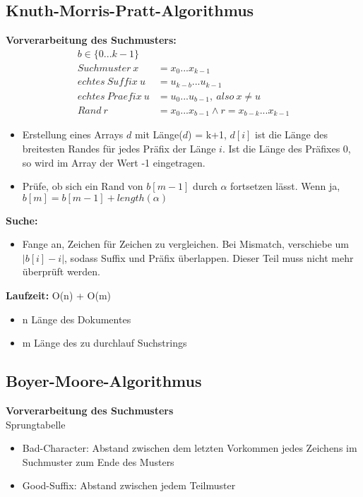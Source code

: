 \documentclass{article}
\begin{document}
\subsection{Knuth-Morris-Pratt-Algorithmus}
\textbf{Vorverarbeitung des Suchmusters:}
\begin{align*}
b \in \{0...k-1\}\\
Suchmuster\ x &= x_{0} ... x_{k-1} \\
echtes\ Suffix\ u &= u_{k-b} ... u_{k-1} \\
echtes\ Praefix\ u &= u_{0} ... u_{b-1}, \ also\ x \neq u \\
Rand\ r &= x_{0} ... x_{b-1} \wedge r = x_{b-k} ... x_{k-1}
\end{align*}
\begin{itemize}
\item Erstellung eines Arrays $d$ mit Länge($d$) = k+1, $d[i]$ ist die Länge des breitesten Randes für jedes Präfix der Länge $i$. Ist die Länge des Präfixes 0, so wird im Array der Wert -1 eingetragen.
\item Prüfe, ob sich ein Rand von $b[m-1]$ durch $\alpha$ fortsetzen lässt. Wenn ja, $b[m] = b[m-1] + length(\alpha) $
\end{itemize}
\textbf{Suche:}
\begin{itemize}
\item Fange an, Zeichen für Zeichen zu vergleichen. Bei Mismatch, verschiebe um $| b[i] - i |$, sodass Suffix und Präfix überlappen. Dieser Teil muss nicht mehr überprüft werden.
\end{itemize}
\textbf{Laufzeit: } O(n) + O(m) 
\begin{itemize}
\item n Länge des Dokumentes 
\item m Länge des zu durchlauf Suchstrings 
\end{itemize} 

\subsection{Boyer-Moore-Algorithmus}
\textbf{Vorverarbeitung des Suchmusters}\\
Sprungtabelle
\begin{itemize}
\item Bad-Character: Abstand zwischen dem letzten Vorkommen jedes Zeichens im Suchmuster zum Ende des Musters
\item Good-Suffix: Abstand zwischen jedem Teilmuster
\end{itemize}
\end{document}
